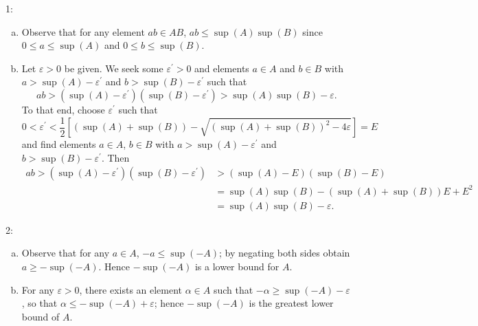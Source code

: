 \documentclass[12pt]{amsart}
\begin{document}
1:
\begin{enumerate}[(a)]
    \item Observe that for any element $ab\in AB$, $ab\leq \sup(A)\sup(B)$ since $0\leq a\leq \sup(A)$ and $0\leq b\leq \sup(B)$.
    \item Let $\varepsilon>0$ be given. We seek some $\varepsilon^{\prime}>0$ and elements $a\in A$ and $b\in B$ with $a > \sup(A)-\varepsilon^{\prime}$ and $b > \sup(B)-\varepsilon^{\prime}$ such that \[ab > (\sup(A)-\varepsilon^{\prime})(\sup(B)-\varepsilon^{\prime}) > \sup(A)\sup(B)-\varepsilon.\] To that end, choose $\varepsilon^{\prime}$ such that \[0 < \varepsilon^{\prime} < \frac{1}{2}\left[(\sup(A)+\sup(B)) - \sqrt{(\sup(A)+\sup(B))^2-4\varepsilon}\right] = E\] and find elements $a\in A$, $b\in B$ with $a>\sup(A)-\varepsilon^{\prime}$ and $b> \sup(B)-\varepsilon^{\prime}$. Then \begin{align*}
        ab > (\sup(A)-\varepsilon^{\prime})(\sup(B)-\varepsilon^{\prime}) &> (\sup(A)-E)(\sup(B)-E)\\
        &= \sup(A)\sup(B) - (\sup(A)+\sup(B))E + E^2\\
        &= \sup(A)\sup(B)-\varepsilon.
    \end{align*}
\end{enumerate}

2: \begin{enumerate}[(a)]
    \item Observe that for any $a\in A$, $-a\leq \sup(-A)$; by negating both sides obtain $a\geq -\sup(-A)$. Hence $-\sup(-A)$ is a lower bound for $A$.
    \item For any $\varepsilon>0$, there exists an element $\alpha\in A$ such that $-\alpha\geq \sup(-A)-\varepsilon$, so that $\alpha \leq -\sup(-A) + \varepsilon$; hence $-\sup(-A)$ is the greatest lower bound of $A$.
\end{enumerate}
\end{document}
